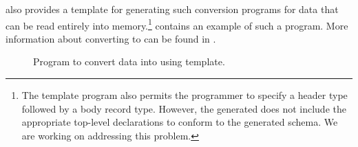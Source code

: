  \pads{} also provides a template for generating such conversion programs for data that can be read entirely into memory.\footnote{
  The \xml{} template program also permits the programmer to specify a header type followed by a body record type.  However, the generated \xml{} does not include the appropriate top-level declarations to conform to the generated \xml{} schema.  We are working on addressing this problem.
} %
 contains an example of such a program.
More information about converting to \xml{} can be found in .
\begin{figure*}
\begin{small}
\end{small}
\caption{Program to convert \dibbler{} data into \xml{} using \pads{} template.}
\label{figure:sirius-xml}
\end{figure*}












